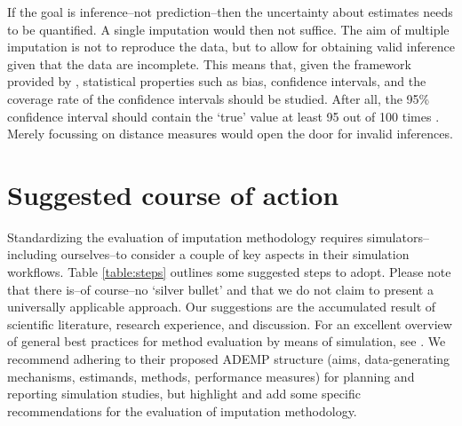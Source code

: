 \documentclass[bimj,fleqn]{w-art}
\begin{document}
If the goal is inference--not prediction--then the uncertainty about estimates needs to be quantified. A single imputation would then not suffice. The aim of multiple imputation is not to reproduce the data, but to allow for obtaining valid inference given that the data are incomplete. This means that, given the framework provided by \citet{rubi87}, statistical properties such as bias, confidence intervals, and the coverage rate of the confidence intervals should be studied. After all, the 95\% confidence interval should contain the `true' value at least 95 out of 100 times \citep[][p. 591]{neym34}. Merely focussing on distance measures would open the door for invalid inferences.



\section{Suggested course of action}

Standardizing the evaluation of imputation methodology requires simulators--including ourselves--to consider a couple of key aspects in their simulation workflows. Table \ref{table:steps} outlines some suggested steps to adopt. Please note that there is--of course--no `silver bullet' and that we do not claim to present a universally applicable approach. Our suggestions are the accumulated result of scientific literature, research experience, and discussion. For an excellent overview of general best practices for method evaluation by means of simulation, see \citet{morr18}. We recommend adhering to their proposed ADEMP structure (aims, data-generating mechanisms, estimands, methods, performance measures) for planning and reporting simulation studies, but highlight and add some specific recommendations for the evaluation of imputation methodology.
\end{document}
